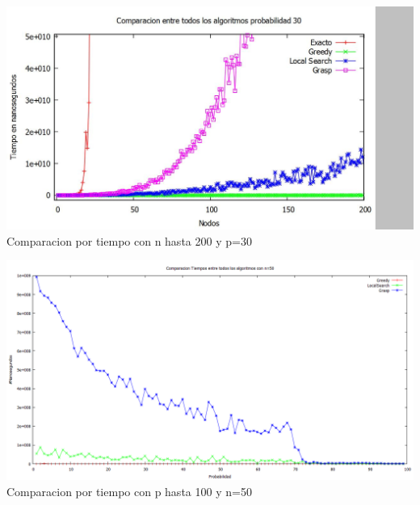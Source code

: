 \begin{center}
\includegraphics[width=17cm]{./graficos/comparaciontiemponvariablep30.png}\\
Comparacion por tiempo con n hasta 200 y p=30
\end{center}




\begin{center}
\includegraphics[width=17cm]{./graficos/comparaciontiemposprobvariablen50.png}\\
Comparacion por tiempo con p hasta 100 y n=50
\end{center}


